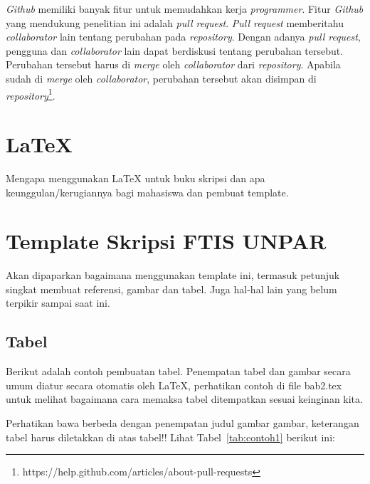 \textit{Github} memiliki banyak fitur untuk memudahkan kerja \textit{programmer}. Fitur \textit{Github} yang mendukung penelitian ini adalah \textit{pull request}. \textit{Pull request} memberitahu \textit{collaborator} lain tentang perubahan pada \textit{repository}. Dengan adanya \textit{pull request}, pengguna dan \textit{collaborator} lain dapat berdiskusi tentang perubahan tersebut. Perubahan tersebut harus di \textit{merge} oleh \textit{collaborator} dari \textit{repository}. Apabila sudah di \textit{merge} oleh \textit{collaborator}, perubahan tersebut akan disimpan di \textit{repository}\footnote{https://help.github.com/articles/about-pull-requests}.

\section{\LaTeX}
\label{sec:latex}

Mengapa menggunakan \LaTeX{} untuk buku skripsi dan apa keunggulan/kerugiannya bagi mahasiswa dan pembuat template. 



\section{Template Skripsi FTIS UNPAR}
\label{sec:template}
 
Akan dipaparkan bagaimana menggunakan template ini, termasuk petunjuk singkat membuat referensi, gambar dan tabel.
Juga hal-hal lain yang belum terpikir sampai saat ini. 
 

\subsection{Tabel}  
Berikut adalah contoh pembuatan tabel. 
Penempatan tabel dan gambar secara umum diatur secara otomatis oleh \LaTeX{}, perhatikan contoh di file bab2.tex untuk melihat bagaimana cara memaksa tabel ditempatkan sesuai keinginan kita.

Perhatikan bawa berbeda dengan penempatan judul gambar gambar, keterangan tabel harus diletakkan di atas tabel!!
Lihat Tabel~\ref{tab:contoh1} berikut ini:

